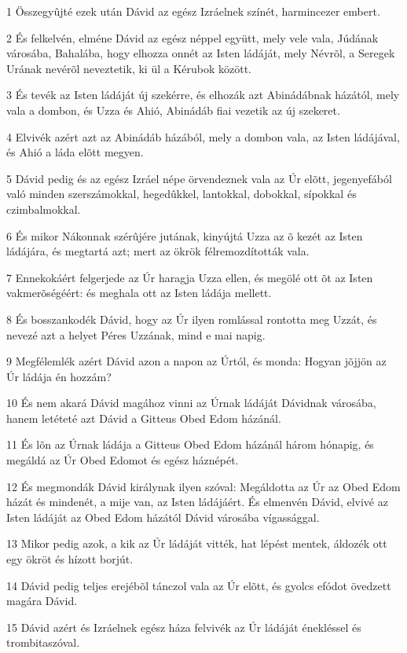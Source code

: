 \par 1 Összegyûjté ezek után Dávid az egész Izráelnek színét, harmincezer embert.
\par 2 És felkelvén, elméne Dávid az egész néppel együtt, mely vele vala, Júdának városába, Bahalába, hogy elhozza onnét az Isten ládáját, mely Névrõl, a Seregek Urának nevérõl neveztetik, ki ül a Kérubok  között.
\par 3 És tevék az Isten ládáját új szekérre, és elhozák azt Abinádábnak házától, mely vala a dombon, és Uzza és Ahió, Abinádáb fiai vezetik az új szekeret.
\par 4 Elvivék azért azt az Abinádáb házából, mely a dombon vala, az Isten ládájával, és Ahió a láda elõtt megyen.
\par 5 Dávid pedig és az egész Izráel népe örvendeznek vala az Úr elõtt, jegenyefából való minden szerszámokkal, hegedûkkel, lantokkal, dobokkal, sípokkal és czimbalmokkal.
\par 6 És mikor Nákonnak szérûjére jutának, kinyújtá Uzza az õ kezét az Isten ládájára, és megtartá azt; mert az ökrök félremozdították vala.
\par 7 Ennekokáért felgerjede az Úr haragja Uzza ellen, és megölé ott õt az Isten vakmerõségéért: és meghala ott az Isten ládája mellett.
\par 8 És bosszankodék Dávid, hogy az Úr ilyen romlással rontotta meg Uzzát, és nevezé azt a helyet Péres Uzzának, mind e mai napig.
\par 9 Megfélemlék azért Dávid azon a napon az Úrtól, és monda: Hogyan jõjjön az Úr ládája én hozzám?
\par 10 És nem akará Dávid magához vinni az Úrnak ládáját Dávidnak városába, hanem letéteté azt Dávid a Gitteus Obed  Edom házánál.
\par 11 És lõn az Úrnak ládája a Gitteus Obed Edom házánál három hónapig, és megáldá az Úr Obed Edomot és egész háznépét.
\par 12 És megmondák Dávid királynak ilyen szóval: Megáldotta az Úr az Obed Edom házát és mindenét, a mije van, az Isten ládájáért. És elmenvén Dávid, elvivé  az Isten ládáját az Obed Edom házától Dávid városába  vígassággal.
\par 13 Mikor pedig azok, a kik az Úr ládáját vitték, hat lépést mentek, áldozék ott egy ökröt és hízott borjút.
\par 14 Dávid pedig teljes erejébõl tánczol vala az Úr elõtt, és gyolcs  efódot övedzett magára Dávid.
\par 15 Dávid azért és Izráelnek egész háza felvivék az Úr ládáját énekléssel és trombitaszóval.
